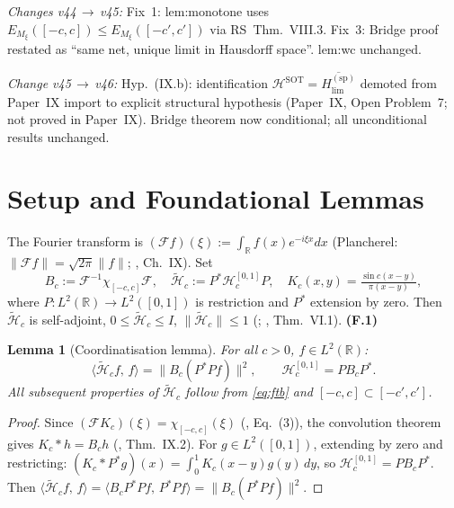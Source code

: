\documentclass[12pt,a4paper]{amsart}
\newtheorem{lemma}[theorem]{Lemma}
\theoremstyle{definition}
\theoremstyle{remark}
\newcommand{\ip}[2]{\langle #1,\, #2\rangle}
\newcommand{\Hc}{\widetilde{\mathcal{H}}_c}
\newcommand{\Hspectral}{H_{\lim}^{(\mathrm{sp})}}
\newcommand{\HSOT}{\mathcal{H}^{\mathrm{SOT}}}
\newcommand{\Fc}{\mathcal{F}}
\newcommand{\Bc}{B_c}
\begin{document}
\textit{Changes v44\,$\to$\,v45:}
Fix~1: lem:monotone uses
$E_{M_\xi}([-c,c])\le E_{M_\xi}([-c',c'])$
via RS~Thm.~VIII.3.
Fix~3: Bridge proof restated as
``same net, unique limit in
Hausdorff space''.
lem:wc unchanged.

\textit{Change v45\,$\to$\,v46:}
Hyp.~(IX.b): identification
$\HSOT=\overline{\Hspectral}$ demoted
from Paper~IX import to explicit
structural hypothesis
(Paper~IX, Open Problem~7;
not proved in Paper~IX).
Bridge theorem now conditional;
all unconditional results unchanged.

\tableofcontents

\section{Setup and Foundational Lemmas}
\label{sec:setup}

The Fourier transform is
$(\Fc f)(\xi):=
\int_{\mathbb{R}}f(x)e^{-i\xi x}dx$
(Plancherel:
$\|\Fc f\|=\sqrt{2\pi}\|f\|$;
\cite{ReedSimon1975}, Ch.~IX).
Set
\begin{equation}\label{eq:ops}
  \Bc:=\Fc^{-1}\chi_{[-c,c]}\Fc,
  \quad
  \Hc:=P^*\mathcal{H}_c^{[0,1]}P,
  \quad
  K_c(x,y)=\tfrac{\sin c(x-y)}{\pi(x-y)},
\end{equation}
where $P:L^2(\mathbb{R})\to L^2([0,1])$
is restriction and $P^*$ extension
by zero.
Then $\Hc$ is self-adjoint,
$0\le\Hc\le I$, $\|\Hc\|\le 1$
(\cite{Slepian1961};
\cite{ReedSimon1975}, Thm.~VI.1).
\hfill\textbf{(F.1)}\label{F1}

\begin{lemma}[Coordinatisation lemma]
\label{lem:ftb}
For all $c>0$, $f\in L^2(\mathbb{R})$:
\begin{equation}\label{eq:ftb}
  \ip{\Hc f}{f}=\|\Bc(P^*Pf)\|^2,
  \qquad
  \mathcal{H}_c^{[0,1]}=P\Bc P^*.
\end{equation}
All subsequent properties of $\Hc$
follow from \eqref{eq:ftb} and
$[-c,c]\subset[-c',c']$.
\end{lemma}

\begin{proof}
Since $(\Fc K_c)(\xi)=\chi_{[-c,c]}(\xi)$
(\cite{Slepian1961}, Eq.~(3)),
the convolution theorem gives
$K_c*h=\Bc h$
(\cite{ReedSimon1975}, Thm.~IX.2).
For $g\in L^2([0,1])$, extending by
zero and restricting:
$(K_c*P^*g)(x)
=\int_0^1 K_c(x-y)g(y)\,dy$,
so $\mathcal{H}_c^{[0,1]}=P\Bc P^*$.
Then $\ip{\Hc f}{f}
=\ip{\Bc P^*Pf}{P^*Pf}
=\|\Bc(P^*Pf)\|^2$.
\end{proof}
\end{document}
